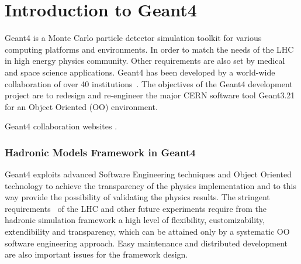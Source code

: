 \section{Introduction to {\sc Geant4} }


Geant4 is a Monte Carlo particle detector simulation toolkit for
various computing platforms and en\-vi\-ron\-ments\cite{G4UserRequirements}.
In order to match the needs of the LHC in high energy physics
community. Other requirements are also set by medical and space
science applications. Geant4 has been developed by a world-wide collaboration of over 40
institutions~\cite{wellisch99,MoURD44}.  
The objectives of the Geant4 development project are to redesign and
re-engineer the major CERN software tool Geant3.21 for an Object Oriented (OO) environment. 

Geant4 collaboration websites \cite{webG4INFN}.

\subsubsection{Hadronic Models Framework in Geant4}




Geant4 exploits advanced Software Engineering techniques and Object
Oriented technology to achieve the transparency of the physics
implementation and to this way provide the possibility of validating the
physics results. The stringent requirements~\cite{wellisch99} of the
LHC and other future experiments require from the hadronic simulation framework a high
level of flexibility, customizability, extendibility and transparency,
which can be attained only by a systematic OO software engineering
approach. Easy maintenance and distributed development are also
important issues for the framework design.

